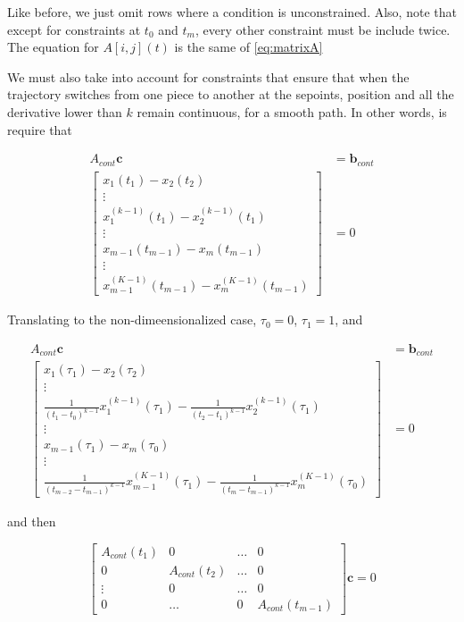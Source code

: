 \noindent Like before, we just omit rows where a condition is unconstrained. Also, note that except for constraints at $t_0$ and $t_m$, every other constraint must be include twice. The equation for $A[i,j](t)$ is the same of \eqref{eq:matrixA}

\noindent We must also take into account for constraints that ensure that when the trajectory switches from one piece to another at the sepoints, position and all the derivative lower than $k$ remain continuous, for a smooth path. In other words, is require that

\begin{align}
	A_{cont}\mathbf{c} &= \mathbf{b}_{cont} \\
	\begin{bmatrix}
		x_1(t_1)-x_2(t_2) 							  \\
		\vdots            							  \\
		x_1^{(k-1)}(t_1)-x_2^{(k-1)}(t_1) 			  \\
		\vdots                                        \\
		x_{m-1}(t_{m-1})-x_m(t_{m-1})                 \\
		\vdots                                        \\
		x_{m-1}^{(K-1)}(t_{m-1})-x_m^{(K-1)}(t_{m-1})
	\end{bmatrix} 
	&= 0 \nonumber
\end{align}

\noindent Translating to the non-dimeensionalized case, $\tau_0=0$, $\tau_1=1$, and

\begin{align}
	A_{cont}\mathbf{c} &= \mathbf{b}_{cont} \\
	\begin{bmatrix}
		x_1(\tau_1)-x_2(\tau_2) \\
		\vdots \\
		\frac{1}{(t_1-t_0)^{k-1}}x_1^{(k-1)}(\tau_1)-\frac{1}{(t_2-t_1)^{k-1}}x_2^{(k-1)}(\tau_1) \\
		\vdots \\
		x_{m-1}(\tau_1)-x_m(\tau_0) \\
		\vdots \\
		\frac{1}{(t_{m-2}-t_{m-1})^{k-1}}x_{m-1}^{(K-1)}(\tau_1)-\frac{1}{(t_m-t_{m-1})^{k-1}}x_m^{(K-1)}(\tau_0)
	\end{bmatrix}
	&= 0 \nonumber
\end{align}

\noindent and then

\begin{equation}
	\begin{bmatrix}
		A_{cont}(t_1) & 0             & \dots & 0 \\
		0             & A_{cont}(t_2) &	\dots & 0 \\
		\vdots        & 0             & \dots & 0 \\
		0             & \dots         & 0     & A_{cont}(t_{m-1})  
	\end{bmatrix}
	\mathbf{c}=0
\end{equation}

